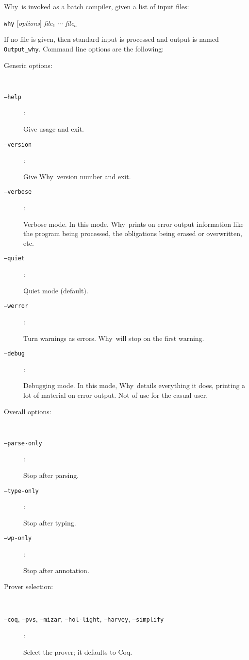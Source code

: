 \documentclass[a4paper,12pt]{report}
\makeatletter
\newcommand{\coq}{\textsf{Coq}\index{Coq@\textsf{Coq}}}
\newcommand{\why}{\textsf{Why}}
\makeatother
\begin{document}
\why\ is invoked as a batch compiler, given a list of input files:
\begin{center}
  \texttt{why} [\textit{options}] \textit{file}$_1$ $\cdots$ \textit{file}$_n$
\end{center}
If no file is given, then standard input is processed and output is
named \texttt{Output\_why}.
Command line options are the following:
\begin{description}
  \item[Generic options:] ~\par
  \item[\texttt{--help}]: ~\par    
    Give usage and exit. 
  \item[\texttt{--version}]: ~\par    
    Give \why\ version number and exit. 
  \item[\texttt{--verbose}]: ~\par 
    Verbose mode. In this mode, \why\ prints on error output
    information like the program being processed, the obligations
    being erased or overwritten, etc.
  \item[\texttt{--quiet}]: ~\par  
    Quiet mode (default).
  \item[\texttt{--werror}]: ~\par 
    Turn warnings as errors. \why\ will stop on the first warning.
  \item[\texttt{--debug}]: ~\par 
    Debugging mode. In this mode, \why\ details everything it does,
    printing a lot of material on error output. Not of use for the
    casual user.

  \item[Overall options:] ~\par
  \item[\texttt{--parse-only}]: ~\par  
    Stop after parsing.
  \item[\texttt{--type-only}]:  ~\par  
    Stop after typing.
  \item[\texttt{--wp-only}]:    ~\par  
    Stop after annotation.

  \item[Prover selection:] ~\par
  \item[\texttt{--coq}, \texttt{--pvs}, \texttt{--mizar}, 
        \texttt{--hol-light}, \texttt{--harvey}, \texttt{--simplify}]: ~\par 
    Select the prover; it defaults to \coq.


\end{description}
\end{document}
